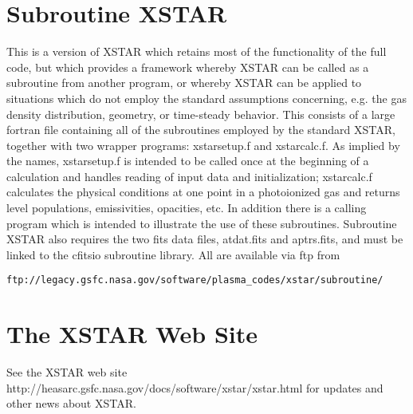 \section{Subroutine XSTAR}

This is a version of XSTAR which retains most of the functionality 
of the full code, but which provides a framework whereby XSTAR can be 
called as a subroutine from another program, or whereby XSTAR can 
be applied to situations which do not employ the standard assumptions 
concerning, e.g. the gas density distribution, geometry, or time-steady
behavior.  This consists of a large fortran file containing all of the 
subroutines employed by the standard XSTAR, together with two wrapper 
programs: xstarsetup.f and xstarcalc.f.  As implied by the names, 
xstarsetup.f is intended to be called once at the beginning of a calculation
and handles reading of input data and initialization; xstarcalc.f 
calculates the physical conditions at one point in a photoionized gas
and returns level populations, emissivities, opacities, etc.
In addition there is a calling program which is intended to illustrate 
the use of these subroutines.  Subroutine XSTAR also requires 
the two fits data files, atdat.fits and aptrs.fits, and must be 
linked to the cfitsio subroutine library.  All are available via ftp from
\begin{verbatim} 
ftp://legacy.gsfc.nasa.gov/software/plasma_codes/xstar/subroutine/
\end{verbatim} 


\section{The XSTAR Web Site}

See the XSTAR web site http://heasarc.gsfc.nasa.gov/docs/software/xstar/xstar.html
for updates and other news about XSTAR.
